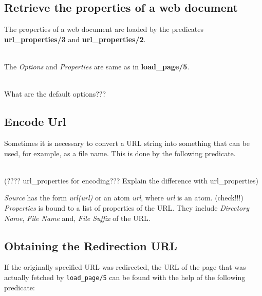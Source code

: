 \subsection{Retrieve the properties of a web document}

The properties of a web document are loaded by the predicates {\bf
  url\_properties/3} and {\bf url\_properties/2}. 

\begin{description}
\item[url\_properties({\it +Url, +Options, -Properties})]\mbox{}
  \\
  The {\it Options} and {\it Properties} are same as in {\bf load\_page/5}.
\item[url\_properties({\it +Url, -Properties})]\mbox{}
  \\
  What are the default options???

\end{description}

\subsection{Encode Url}

Sometimes it is necessary to convert a URL string into something that can
be used, for example, as a file name. This is done by the following
predicate.

\begin{description}
\item[url\_properties({\it +Source, -Properties})]\mbox{}
  \\
  (???? url\_properties for encoding??? Explain the difference with
  url\_properties)

{\it Source} has the form {\it url(url)} or an atom \emph{url}, where
\emph{url} is an atom.   (check!!!)
{\it Properties} is bound to a list of properties of the URL. They include {\it Directory Name}, {\it File Name} and, {\it File Suffix} of the URL.

\end{description}

\subsection{Obtaining the Redirection URL}

If the originally specified URL was redirected, the URL of the page that
was actually fetched by {\tt load\_page/5} can be found with the help of
the following predicate: 

